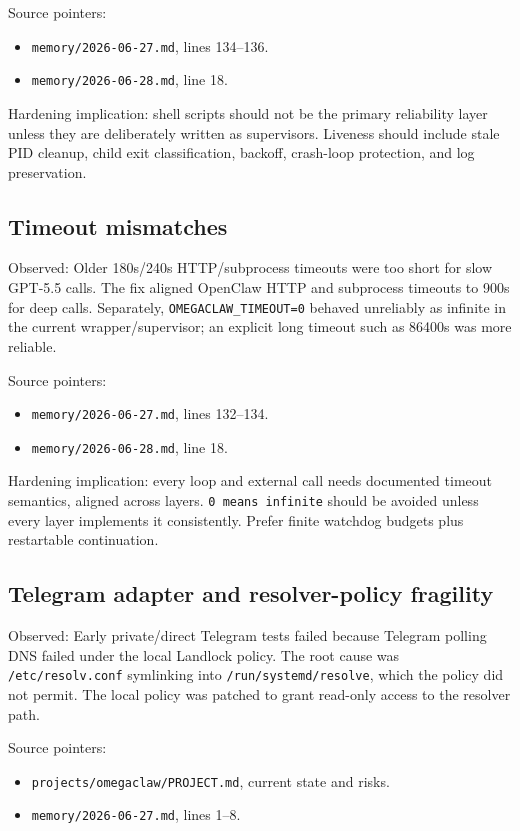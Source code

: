 \documentclass[11pt]{article}
\begin{document}
Source pointers:
\begin{itemize}
  \item \texttt{memory/2026-06-27.md}, lines 134--136.
  \item \texttt{memory/2026-06-28.md}, line 18.
\end{itemize}

Hardening implication: shell scripts should not be the primary reliability layer unless they are deliberately written as supervisors. Liveness should include stale PID cleanup, child exit classification, backoff, crash-loop protection, and log preservation.

\subsection{Timeout mismatches}

Observed: Older 180s/240s HTTP/subprocess timeouts were too short for slow GPT-5.5 calls. The fix aligned OpenClaw HTTP and subprocess timeouts to 900s for deep calls. Separately, \texttt{OMEGACLAW\_TIMEOUT=0} behaved unreliably as infinite in the current wrapper/supervisor; an explicit long timeout such as 86400s was more reliable.

Source pointers:
\begin{itemize}
  \item \texttt{memory/2026-06-27.md}, lines 132--134.
  \item \texttt{memory/2026-06-28.md}, line 18.
\end{itemize}

Hardening implication: every loop and external call needs documented timeout semantics, aligned across layers. \texttt{0 means infinite} should be avoided unless every layer implements it consistently. Prefer finite watchdog budgets plus restartable continuation.

\subsection{Telegram adapter and resolver-policy fragility}

Observed: Early private/direct Telegram tests failed because Telegram polling DNS failed under the local Landlock policy. The root cause was \texttt{/etc/resolv.conf} symlinking into \texttt{/run/systemd/resolve}, which the policy did not permit. The local policy was patched to grant read-only access to the resolver path.

Source pointers:
\begin{itemize}
  \item \texttt{projects/omegaclaw/PROJECT.md}, current state and risks.
  \item \texttt{memory/2026-06-27.md}, lines 1--8.
\end{itemize}
\end{document}
